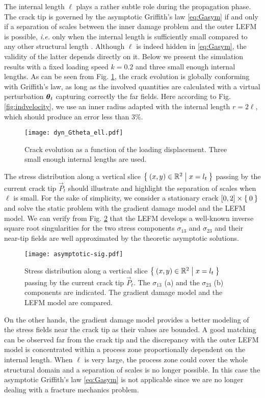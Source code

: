 The internal length $\ell$ plays a rather subtle role during the propagation phase. The crack tip is governed by the asymptotic Griffith's law \eqref{eq:Gasym} if and only if a separation of scales between the inner damage problem and the outer LEFM is possible, \emph{i.e.} only when the internal length is sufficiently small compared to any other structural length \cite{SicsicMarigo:2013}. Although $\ell$ is indeed hidden in \eqref{eq:Gasym}, the validity of the latter depends directly on it. Below we present the simulation results with a fixed loading speed $k=0.2$ and three small enough internal lengths. As can be seen from Fig. \ref{fig:evoGtGcell}, the crack evolution is globally conforming with Griffith's law, as long as the involved quantities are calculated with a virtual perturbation $\vtheta_t$ capturing correctly the far fields. Here according to Fig. \ref{fig:indvelocity}, we use an inner radius adapted with the internal length $r=2\ell$, which should produce an error less than $3\%$.
\begin{figure}[htbp]
\centering
\texttt{[image: dyn\_Gtheta\_ell.pdf]}
\caption{Crack evolution as a function of the loading displacement. Three small enough internal lengths are used.} \label{fig:evoGtGcell}
\end{figure}

The stress distribution along a vertical slice $\Set{(x,y)\in\mathbb{R}^2|x=l_t}$ passing by the current crack tip $\vec{P}_t$ should illustrate and highlight the separation of scales when $\ell$ is small. For the sake of simplicity, we consider a stationary crack $[0,2]\times\Set{0}$ and solve the static problem with the gradient damage model and the LEFM model. We can verify from Fig. \ref{fig:stress} that the LEFM develops a well-known inverse square root singularities for the two stress components $\sigma_{13}$ and $\sigma_{23}$ and their near-tip fields are well approximated by the theoretic asymptotic solutions.
\begin{figure}[htbp]
\centering
\texttt{[image: asymptotic-sig.pdf]}
\caption{Stress distribution along a vertical slice $\Set{(x,y)\in\mathbb{R}^2|x=l_t}$ passing by the current crack tip $\vec{P}_t$. The $\sigma_{13}$ (a) and the $\sigma_{23}$ (b) components are indicated. The gradient damage model and the LEFM model are compared.} \label{fig:stress}
\end{figure}
On the other hands, the gradient damage model provides a better modeling of the stress fields near the crack tip as their values are bounded. A good matching can be observed far from the crack tip and the discrepancy with the outer LEFM model is concentrated within a process zone proportionally dependent on the internal length. When $\ell$ is very large, the process zone could cover the whole structural domain and a separation of scales is no longer possible. In this case the asymptotic Griffith's law \eqref{eq:Gasym} is not applicable since we are no longer dealing with a fracture mechanics problem.

